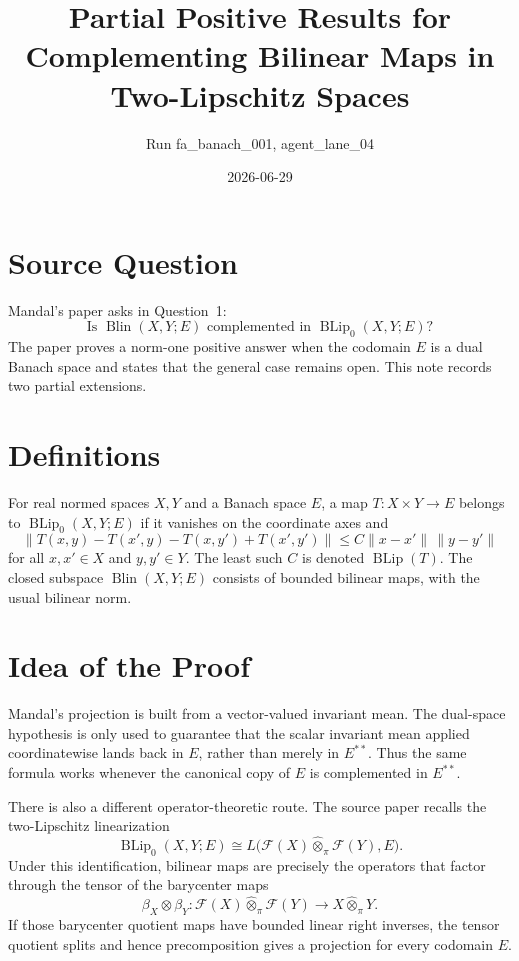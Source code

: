 \documentclass[11pt]{article}
\title{Partial Positive Results for Complementing Bilinear Maps in Two-Lipschitz Spaces}
\author{Run fa\_banach\_001, agent\_lane\_04}
\date{2026-06-29}
\newcommand{\BLip}{\operatorname{BLip}}
\newcommand{\Blin}{\operatorname{Blin}}
\newcommand{\F}{\mathcal F}
\begin{document}
\maketitle

\section*{Source Question}

Mandal's paper \cite{mandal} asks in Question~1:
\[
\text{Is } \Blin(X,Y;E)\text{ complemented in }\BLip_0(X,Y;E)?
\]
The paper proves a norm-one positive answer when the codomain $E$ is a dual
Banach space and states that the general case remains open. This note records
two partial extensions.

\section*{Definitions}

For real normed spaces $X,Y$ and a Banach space $E$, a map
$T:X\times Y\to E$ belongs to $\BLip_0(X,Y;E)$ if it vanishes on the coordinate
axes and
\[
\|T(x,y)-T(x',y)-T(x,y')+T(x',y')\|
   \leq C\|x-x'\|\,\|y-y'\|
\]
for all $x,x'\in X$ and $y,y'\in Y$. The least such $C$ is denoted
$\BLip(T)$. The closed subspace $\Blin(X,Y;E)$ consists of bounded bilinear
maps, with the usual bilinear norm.

\section*{Idea of the Proof}

Mandal's projection is built from a vector-valued invariant mean. The dual-space
hypothesis is only used to guarantee that the scalar invariant mean applied
coordinatewise lands back in $E$, rather than merely in $E^{**}$. Thus the same
formula works whenever the canonical copy of $E$ is complemented in $E^{**}$.

There is also a different operator-theoretic route. The source paper recalls
the two-Lipschitz linearization
\[
\BLip_0(X,Y;E)\cong
L\bigl(\F(X)\widehat\otimes_\pi \F(Y),E\bigr).
\]
Under this identification, bilinear maps are precisely the operators that
factor through the tensor of the barycenter maps
\[
\beta_X\otimes\beta_Y:
\F(X)\widehat\otimes_\pi\F(Y)\longrightarrow X\widehat\otimes_\pi Y.
\]
If those barycenter quotient maps have bounded linear right inverses, the
tensor quotient splits and hence precomposition gives a projection for every
codomain $E$.
\end{document}
